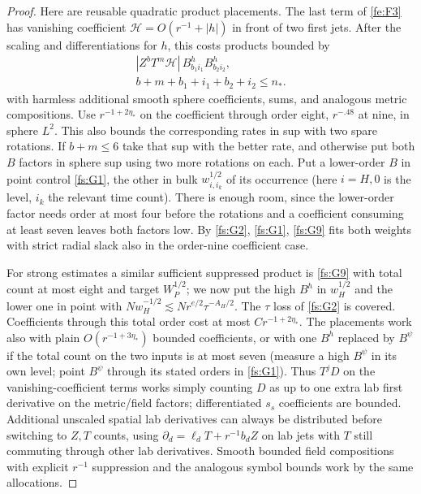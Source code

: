 \begin{proof}
Here are reusable quadratic product placements. The last term of \eqref{fe:F3} has vanishing coefficient \(\mathcal H=O(r^{-1}+|h|)\) in front of two first jets. After the scaling and differentiations for \(h\), this costs products bounded by
\begin{equation}
\label{fs:G9}
\begin{gathered}
 |Z^b T^m\mathcal H|\, B^h_{b_1 i_1} B^h_{b_2 i_2},\\
 b+m+b_1+i_1+b_2+i_2\le n_* .
\end{gathered}
\end{equation}
with harmless additional smooth sphere coefficients, sums, and analogous metric compositions. Use \(r^{-1+2\eta_*}\) on the coefficient through order eight, \(r^{-.48}\) at nine, in sphere \(L^2\). This also bounds the corresponding rates in sup with two spare rotations. If \(b+m\le6\) take that sup with the better rate, and otherwise put both \(B\) factors in sphere sup using two more rotations on each. Put a lower-order \(B\) in point control \eqref{fs:G1}, the other in bulk \(w_{i,i_k}^{1/2}\) of its occurrence (here \(i=H,0\) is the level, \(i_k\) the relevant time count). There is enough room, since the lower-order factor needs order at most four before the rotations and a coefficient consuming at least seven leaves both factors low. By \eqref{fs:G2}, \eqref{fs:G1}, \eqref{fs:G9} fits both weights with strict radial slack also in the order-nine coefficient case.

For strong estimates a similar sufficient suppressed product is \eqref{fs:G9} with total count at most eight and target \(W_P^{1/2}\); we now put the high \(B^h\) in \(w_H^{1/2}\) and the lower one in point with \(Nw_H^{-1/2}\lesssim N r^{e/2}\tau^{-A_H/2}\). The \(\tau\) loss of \eqref{fs:G2} is covered. Coefficients through this total order cost at most \(C r^{-1+2\eta_*}\). The placements work also with plain \(O(r^{-1+3\eta_*})\) bounded coefficients, or with one \(B^h\) replaced by \(B^\psi\) if the total count on the two inputs is at most seven (measure a high \(B^\psi\) in its own level; point \(B^\psi\) through its stated orders in \eqref{fs:G1}). Thus \(T^jD\) on the vanishing-coefficient terms works simply counting \(D\) as up to one extra lab first derivative on the metric/field factors; differentiated \(s_s\) coefficients are bounded. Additional unscaled spatial lab derivatives can always be distributed before switching to \(Z,T\) counts, using \(\partial_d=\ell_d T+r^{-1}b_d Z\) on lab jets with \(T\) still commuting through other lab derivatives. Smooth bounded field compositions with explicit \(r^{-1}\) suppression and the analogous symbol bounds work by the same allocations.


\end{proof}
